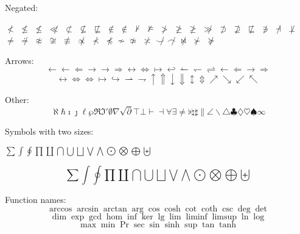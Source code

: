 \documentclass[12pt,a4paper]{article}
\begin{document}
Negated:
\par
$\not<$ $\not\le$ $\not\leq$ $\not\ll$ $\not\subset$ $\not\subseteq$ $\not\sqsubseteq$ $\not\in$ $\notin$ $\not\vdash$ $\not\models$ $\not>$ $\not\ge$ $\not\geq$ $\not\gg$ $\not\supset$ $\not\supseteq$ $\not\sqsubseteq$ $\not\ni$ $\not\dashv$ $\not\perp$ $\not=$ $\not\doteq$ $\not\approx$ $\not\cong$ $\not\equiv$ $\not\propto$ $\not\prec$ $\not\preceq$ $\not\sim$ $\not\simeq$ $\not\asymp$ $\not\smile$ $\not\frown$ $\not\bowtie$ $\not\succ$ $\not\succeq$

Arrows:
\begin{equation}
\leftarrow \gets \Leftarrow \rightarrow \to \Rightarrow \leftrightarrow \Leftrightarrow \mapsto \hookleftarrow \leftharpoonup \leftharpoondown \rightleftharpoons \longleftarrow \Longleftarrow \longrightarrow \Longrightarrow 
\end{equation}
\begin{equation}
\longleftrightarrow \Longleftrightarrow \iff \longmapsto \hookrightarrow \rightharpoonup \rightharpoondown \uparrow \Uparrow \downarrow \Downarrow \updownarrow \Updownarrow \nearrow \searrow \swarrow \nwarrow
\end{equation}

Other:
\begin{equation}
\aleph \hbar \imath \jmath \ell \wp \Re \Im \prime \emptyset \nabla \surd \partial \top \bot \vdash \dashv \forall \exists \neq \flat \natural \sharp \| \angle \backslash \triangle \clubsuit \diamondsuit \heartsuit \spadesuit \infty
\end{equation}

Symbols with two sizes: 
\begin{center}
$\sum \int \oint \prod \coprod \bigcap \bigcup \bigsqcup \bigvee \bigwedge \bigodot \bigotimes \bigoplus \biguplus$
\end{center}
\begin{equation}
\sum \int \oint \prod \coprod \bigcap \bigcup \bigsqcup \bigvee \bigwedge \bigodot \bigotimes \bigoplus \biguplus
\end{equation}

Function names:
\begin{equation}
\arccos \arcsin \arctan \arg \cos \cosh \cot \coth \csc \deg \det 
\end{equation}
\begin{equation}
\dim \exp \gcd \hom \inf \ker \lg \lim \liminf \limsup \ln \log 
\end{equation}
\begin{equation}
\max \min \Pr \sec \sin \sinh \sup \tan \tanh
\end{equation}
\end{document}
